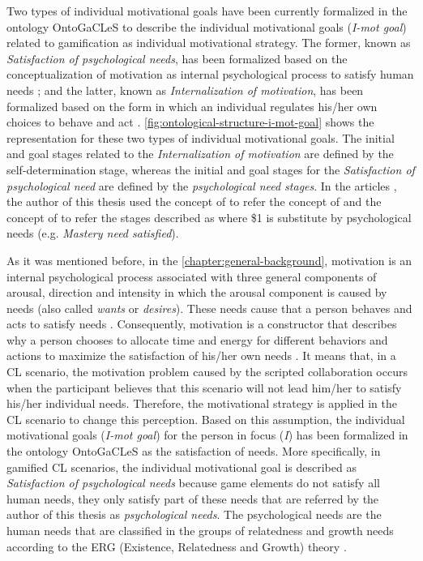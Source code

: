 Two types of individual motivational goals have been currently formalized in the ontology OntoGaCLeS to describe the individual motivational goals (\emph{I-mot goal}) related to gamification as individual motivational strategy. The former, known as \emph{Satisfaction of psychological needs}, has been formalized based on the conceptualization of motivation as internal psychological process to satisfy human needs \cite{PritchardAshwood2008}; and the latter, known as \emph{Internalization of motivation}, has been formalized based on the form in which an individual regulates his/her own choices to behave and act \cite{DeciRyan2010}. \autoref{fig:ontological-structure-i-mot-goal} shows the representation for these two types of individual motivational goals. The initial and goal stages related to the \emph{Internalization of motivation} are defined by the self-determination stage, whereas the initial and goal stages for the \emph{Satisfaction of psychological need} are defined by the \emph{psychological need stages}. In the articles  \cite{ChallcoMoreiraBittencourtMizoguchiIsotani2015, ChallcoMoreiraMizoguchiIsotani2014, ChallcoMoreiraMizoguchiIsotani2014a}, the author of this thesis used the concept of  to refer the concept of  and the concept of  to refer the stages described as  where \$1 is substitute by psychological needs (e.g. \emph{Mastery need satisfied}).

As it was mentioned before, in the \autoref{chapter:general-background}, motivation is an internal psychological process associated with three general components of arousal, direction and intensity in which the arousal component is caused by needs (also called \emph{wants} or \emph{desires}). These needs cause that a person behaves and acts to satisfy needs \cite{MitchellDaniels2003}. Consequently, motivation is a constructor that describes why a person chooses to allocate time and energy for different behaviors and actions to maximize the satisfaction of his/her own needs \cite{PritchardAshwood2008}. It means that, in a CL scenario, the motivation problem caused by the scripted collaboration occurs when the participant believes that this scenario will not lead him/her to satisfy his/her individual needs. Therefore, the motivational strategy is applied in the CL scenario to change this perception. Based on this assumption, the individual motivational goals (\emph{I-mot goal}) for the person in focus (\emph{I}) has been formalized in the ontology OntoGaCLeS as the satisfaction of needs. More specifically, in gamified CL scenarios, the individual motivational goal is described as \emph{Satisfaction of psychological needs} because game elements do not satisfy all human needs, they only satisfy part of these needs that are referred by the author of this thesis as \emph{psychological needs}. The psychological needs are the human needs that are classified in the groups of relatedness and growth needs according to the ERG (Existence, Relatedness and Growth) theory \cite{Alderfer1972}.

